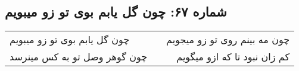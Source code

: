 \begin{center}
\section*{شماره ۶۷: چون گل یابم بوی تو زو میبویم}
\label{sec:067}
\begin{longtable}{l p{0.5cm} r}
چون گل یابم بوی تو زو میبویم
&&
چون مه بینم روی تو زو میجویم
\\
چون گوهر وصل تو به کس مینرسد
&&
کم زان نبود تا که ازو میگویم
\\
\end{longtable}
\end{center}
